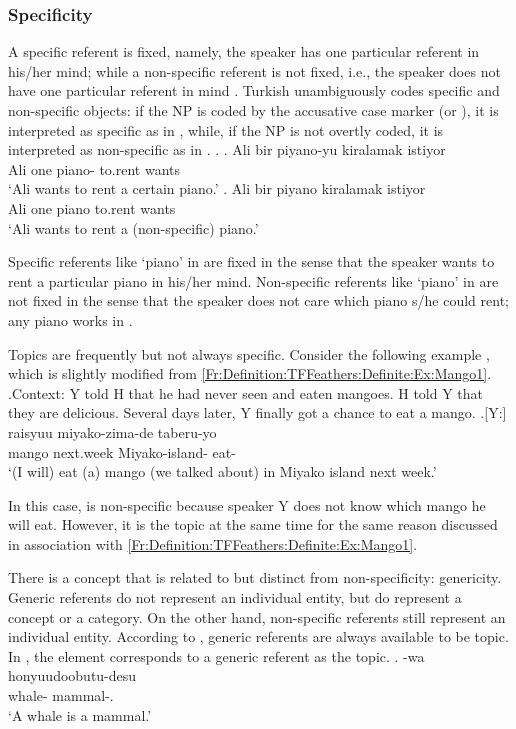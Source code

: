 \subsubsection{Specificity}

A specific referent is fixed, namely, the speaker has one particular referent in his/her mind;
while a non-specific referent is not fixed,
i.e., the speaker does not have one particular referent in mind \cite{karttunen69diss,enc91,abbott94}.
Turkish unambiguously codes specific and non-specific objects:
if the NP is coded by the accusative case marker  (or ),
it is interpreted as specific as in \Next[a],
while, if the NP is not overtly coded,
it is interpreted as non-specific as in \Next[b].
\ex. \ag. Ali bir piyano-yu kiralamak istiyor \\
	Ali one piano- to.rent wants \\
	`Ali wants to rent a certain piano.'
	\bg. Ali bir piyano kiralamak istiyor \\
	Ali one piano to.rent wants \\
	`Ali wants to rent a (non-specific) piano.'
	\hfill{\cite[][p.\ 4-5]{enc91}}

Specific referents like `piano' in \Last[a] are fixed
in the sense that
the speaker wants to rent a particular piano in his/her mind.
Non-specific referents like `piano' in \Last[b] are not fixed
in the sense that
the speaker does not care which piano s/he could rent;
any piano works in \Last[b].

Topics are frequently but not always specific.
Consider the following example \Next,
which is slightly modified from \ref{Fr:Definition:TFFeathers:Definite:Ex:Mango1}.
%
\ex.\label{Fr:Definition:TFFeathers:Specificity:Mango}Context:
	Y told H that he had never seen and eaten mangoes.
	H told Y that they are delicious.
	Several days later, Y finally got a chance to eat a mango.
	\ag.[Y:]  raisyuu miyako-zima-de taberu-yo \\
			mango next.week Miyako-island- eat- \\
			`(I will) eat (a) mango (we talked about) in Miyako island next week.'

In this case,  is non-specific because speaker Y does not know which mango he will eat.
However, it is the topic at the same time for the same reason discussed in association with \ref{Fr:Definition:TFFeathers:Definite:Ex:Mango1}.

There is a concept that is related to but distinct from non-specificity: genericity.
Generic referents do not represent an individual entity,
but do represent a concept or a category.
On the other hand, non-specific referents still represent an individual entity.
According to ,
generic referents are always available to be topic.
In \Next,
the element  corresponds to a generic referent as the topic.
%
\exg. -wa honyuudoobutu-desu \\
		whale- mammal-. \\
		`A whale is a mammal.' \hfill{\cite[][p.\ 270]{kuno72}}

